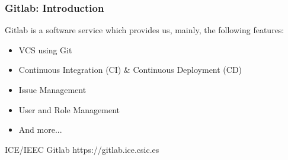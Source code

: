 \begin{frame}

\frametitle{Gitlab: Introduction}


Gitlab is a software service which provides us, mainly, the following features:
\begin{itemize}
\item VCS using Git
\item Continuous Integration (CI) \& Continuous Deployment (CD)
\item Issue Management
\item User and Role Management
\item And more...
\end{itemize}


\pause

\begin{block}{ICE/IEEC Gitlab}
https://gitlab.ice.csic.es
\end{block}

\end{frame}